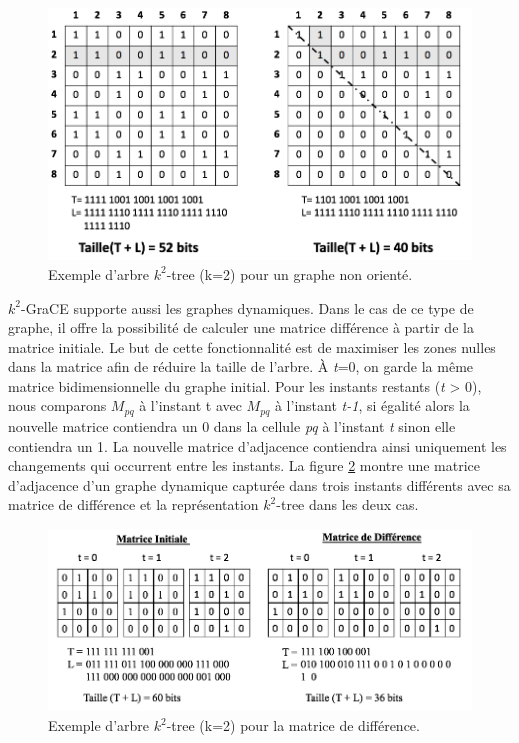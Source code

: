 \documentclass[a4paper,oneside,12pt]{report}
\theoremstyle{definition}
\begin{document}
\begin{figure}[H]
\centering
	\includegraphics[scale=0.4]{./ressources/image/k2_non.png}
	\caption[Exemple d'arbre $k^2$-tree (k=2) pour un graphe non orienté.]{Exemple d'arbre $k^2$-tree (k=2) pour un graphe non orienté.}
	\label{k2_non}
\end{figure}	


	
	$k^2$-GraCE supporte aussi les graphes dynamiques. Dans le cas de ce type de graphe, il offre la possibilité de calculer une matrice différence à partir de la matrice initiale. Le but de cette fonctionnalité est de maximiser les zones nulles dans la matrice afin de réduire la taille de l'arbre. À \textit{t}=0, on garde la même matrice bidimensionnelle du graphe initial. Pour les instants restants (\textit{t} > 0), nous comparons $M_{pq}$ à l'instant t avec $M_{pq}$ à l'instant \textit{t-1}, si égalité alors la nouvelle matrice contiendra un 0 dans la cellule \textit{pq} à l'instant \textit{t} sinon elle contiendra un 1. La nouvelle matrice d'adjacence contiendra ainsi uniquement les changements qui occurrent entre les instants. La figure \ref{mat_diff} montre une matrice d'adjacence d'un graphe dynamique capturée dans trois instants différents avec sa matrice de différence et la représentation $k^2$-tree dans les deux cas.

\begin{figure}[H]
\centering
	\includegraphics[scale=0.48]{./ressources/image/dynk2diff.png}
	\caption[Exemple d'arbre $k^2$-tree (k=2) pour la matrice de différence]{Exemple d'arbre $k^2$-tree (k=2) pour la matrice de différence.}
	\label{mat_diff}
\end{figure}
\end{document}
